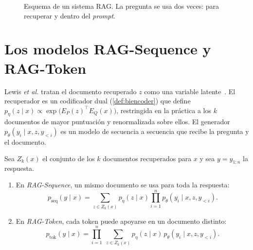 \begin{figure}[h]
\centering
{}
\caption{Esquema de un sistema RAG. La pregunta se usa dos veces: para recuperar y dentro del \emph{prompt}.}
\label{fig:rag}
\end{figure}

\section{Los modelos RAG-Sequence y RAG-Token}

Lewis \emph{et al.} tratan el documento recuperado $z$ como una variable latente~\cite[§2.1]{rag}. El recuperador es un codificador dual (\cref{def:biencoder}) que define $p_\eta(z\mid x)\propto\exp\bigl(E_P(z)^{\top}E_Q(x)\bigr)$, restringida en la práctica a los $k$ documentos de mayor puntuación y renormalizada sobre ellos. El generador $p_\theta(y_i\mid x,z,y_{<i})$ es un modelo de secuencia a secuencia que recibe la pregunta y el documento.

\begin{definicion}\label{def:rag}
Sea $Z_k(x)$ el conjunto de los $k$ documentos recuperados para $x$ y sea $y=y_{1:n}$ la respuesta.
\begin{enumerate}
  \item En \emph{RAG-Sequence}, un mismo documento se usa para toda la respuesta:
  \[
  p_{\mathrm{seq}}(y\mid x)=\sum_{z\in Z_k(x)}p_\eta(z\mid x)\prod_{i=1}^{n}p_\theta(y_i\mid x,z,y_{<i}).
  \]
  \item En \emph{RAG-Token}, cada token puede apoyarse en un documento distinto:
  \[
  p_{\mathrm{tok}}(y\mid x)=\prod_{i=1}^{n}\;\sum_{z\in Z_k(x)}p_\eta(z\mid x)\,p_\theta(y_i\mid x,z,y_{<i}).
  \]
\end{enumerate}
\end{definicion}


